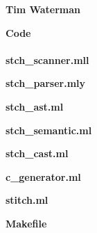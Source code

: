 \documentclass[11pt, oneside]{article}   	%
\newcommand{\tab} {\hspace*{2em}}
\begin{document}
\newpage
\Large\textbf{Tim Waterman}\\[1em]
\normalsize
\newpage

\newpage
\LARGE\textbf{Code}\\[2em]
\normalsize
\tab\\[2em]

\newpage
\Large\textbf{stch\_scanner.mll}\\[1em]
\normalsize

\newpage

\Large\textbf{stch\_parser.mly}\\[1em]
\normalsize

\newpage

\Large\textbf{stch\_ast.ml}\\[1em]
\normalsize

\newpage

\Large\textbf{stch\_semantic.ml}\\[1em]
\normalsize

\newpage

\Large\textbf{stch\_cast.ml}\\[1em]
\normalsize

\newpage

\Large\textbf{c\_generator.ml}\\[1em]
\normalsize

\newpage

\Large\textbf{stitch.ml}\\[1em]
\normalsize

\newpage

\Large\textbf{Makefile}\\[1em]
\normalsize

\newpage
\end{document}
